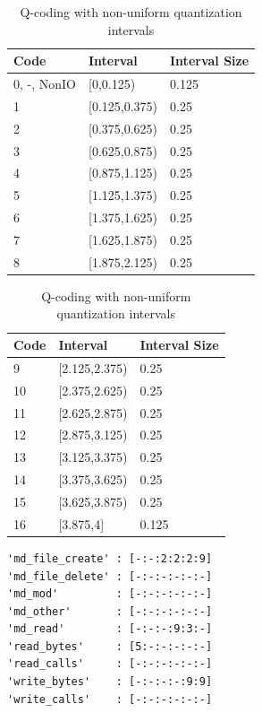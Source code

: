 \documentclass{jhps}
\begin{document}
\begin{table}
  \begin{subtable}{0.49\textwidth}
    \centering
    \begin{tabular}{lll}
      Code & Interval      & Interval Size \\
      \midrule
      0, -, NonIO     & [0,0.125)     & 0.125         \\
      1     & [0.125,0.375) & 0.25          \\
      2    & [0.375,0.625) & 0.25          \\
      3    & [0.625,0.875) & 0.25          \\
      4    & [0.875,1.125) & 0.25          \\
      5    & [1.125,1.375) & 0.25          \\
      6    & [1.375,1.625) & 0.25          \\
      7    & [1.625,1.875) & 0.25          \\
      8     & [1.875,2.125) & 0.25          \\
    \end{tabular}
  \end{subtable}
  \begin{subtable}{0.49\textwidth}
    \centering
    \begin{tabular}{lll}
      Code & Interval      & Interval Size \\
      \midrule
      9     & [2.125,2.375) & 0.25          \\
      10    & [2.375,2.625) & 0.25          \\
      11    & [2.625,2.875) & 0.25          \\
      12    & [2.875,3.125) & 0.25          \\
      13    & [3.125,3.375) & 0.25          \\
      14    & [3.375,3.625) & 0.25          \\
      15    & [3.625,3.875) & 0.25          \\
      16    & [3.875,4]     & 0.125         \\
    \end{tabular}
  \end{subtable}
\caption{Q-coding with non-uniform quantization intervals}
\label{tab:quant_intervals}
\end{table}

\begin{lstlisting}[caption={Q-coding of a six segments long job.}]
'md_file_create' : [-:-:2:2:2:9]
'md_file_delete' : [-:-:-:-:-:-]
'md_mod'         : [-:-:-:-:-:-]
'md_other'       : [-:-:-:-:-:-]
'md_read'        : [-:-:-:9:3:-]
'read_bytes'     : [5:-:-:-:-:-]
'read_calls'     : [-:-:-:-:-:-]
'write_bytes'    : [-:-:-:-:9:9]
'write_calls'    : [-:-:-:-:-:-]
\end{lstlisting}
\end{document}
